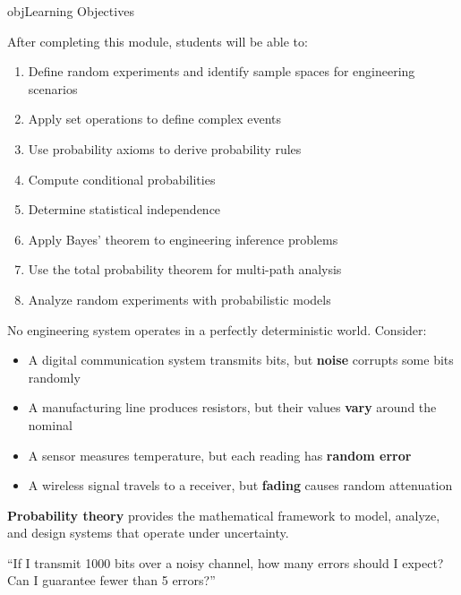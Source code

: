 \begin{PSbox}[unbreakable]{obj}{Learning Objectives}

After completing this module, students will be able to:

\begin{enumerate}
\def\labelenumi{\arabic{enumi}.}
\tightlist
\item
  Define random experiments and identify sample spaces for engineering scenarios
\item
  Apply set operations to define complex events
\item
  Use probability axioms to derive probability rules
\item
  Compute conditional probabilities
\item
  Determine statistical independence
\item
  Apply Bayes’ theorem to engineering inference problems
\item
  Use the total probability theorem for multi-path analysis
\item
  Analyze random experiments with probabilistic models
\end{enumerate}

\end{PSbox}



No engineering system operates in a perfectly deterministic world. Consider:

\begin{itemize}
\tightlist
\item
  A digital communication system transmits bits, but \textbf{noise} corrupts some bits randomly
\item
  A manufacturing line produces resistors, but their values \textbf{vary} around the nominal
\item
  A sensor measures temperature, but each reading has \textbf{random error}
\item
  A wireless signal travels to a receiver, but \textbf{fading} causes random attenuation
\end{itemize}

\textbf{Probability theory} provides the mathematical framework to model, analyze, and design systems that operate under uncertainty.


\begin{PSquote}

``If I transmit 1000 bits over a noisy channel, how many errors should I expect? Can I guarantee fewer than 5 errors?''

\end{PSquote}

